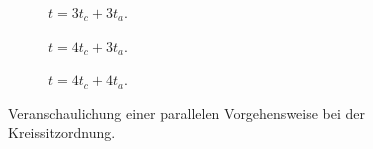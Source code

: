 \begin{figure}[tbp]
\begin{subfigure}{.33\textwidth}
  \caption{$t=3t_c+3t_a$.}
 \end{subfigure}
%
\begin{subfigure}{.33\textwidth}
  \centering 
  \caption{$t=4t_c+3t_a$.}
 \end{subfigure}
%
\begin{subfigure}{.33\textwidth}
  \centering 
  \caption{$t=4t_c+4t_a$.}
 \end{subfigure}
%
\caption{Veranschaulichung einer parallelen Vorgehensweise bei der Kreissitzordnung.}
\label{fig:kreis}
\end{figure}


